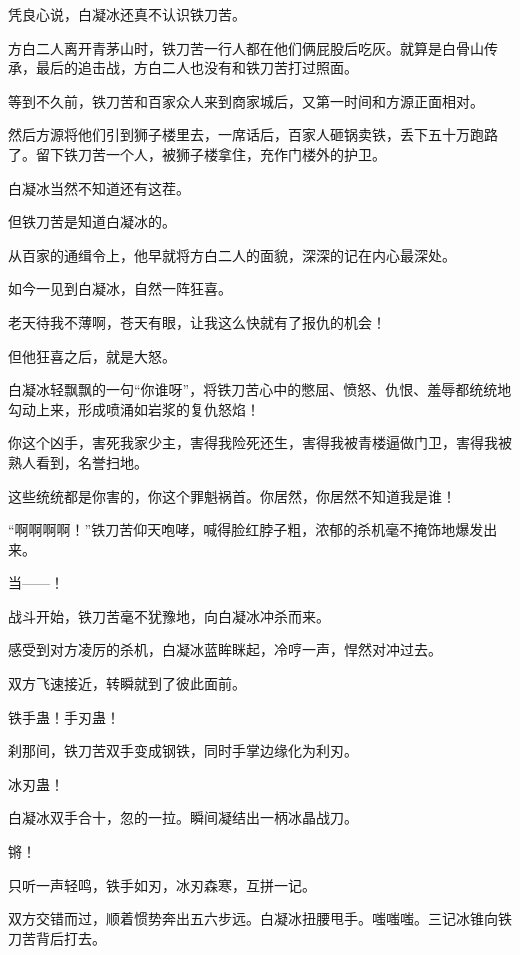 
\begin{this_body}



凭良心说，白凝冰还真不认识铁刀苦。

方白二人离开青茅山时，铁刀苦一行人都在他们俩屁股后吃灰。就算是白骨山传承，最后的追击战，方白二人也没有和铁刀苦打过照面。

等到不久前，铁刀苦和百家众人来到商家城后，又第一时间和方源正面相对。

然后方源将他们引到狮子楼里去，一席话后，百家人砸锅卖铁，丢下五十万跑路了。留下铁刀苦一个人，被狮子楼拿住，充作门楼外的护卫。

白凝冰当然不知道还有这茬。

但铁刀苦是知道白凝冰的。

从百家的通缉令上，他早就将方白二人的面貌，深深的记在内心最深处。

如今一见到白凝冰，自然一阵狂喜。

老天待我不薄啊，苍天有眼，让我这么快就有了报仇的机会！

但他狂喜之后，就是大怒。

白凝冰轻飘飘的一句“你谁呀”，将铁刀苦心中的憋屈、愤怒、仇恨、羞辱都统统地勾动上来，形成喷涌如岩浆的复仇怒焰！

你这个凶手，害死我家少主，害得我险死还生，害得我被青楼逼做门卫，害得我被熟人看到，名誉扫地。

这些统统都是你害的，你这个罪魁祸首。你居然，你居然不知道我是谁！

“啊啊啊啊！”铁刀苦仰天咆哮，喊得脸红脖子粗，浓郁的杀机毫不掩饰地爆发出来。

当——！

战斗开始，铁刀苦毫不犹豫地，向白凝冰冲杀而来。

感受到对方凌厉的杀机，白凝冰蓝眸眯起，冷哼一声，悍然对冲过去。

双方飞速接近，转瞬就到了彼此面前。

铁手蛊！手刃蛊！

刹那间，铁刀苦双手变成钢铁，同时手掌边缘化为利刃。

冰刃蛊！

白凝冰双手合十，忽的一拉。瞬间凝结出一柄冰晶战刀。

锵！

只听一声轻鸣，铁手如刃，冰刃森寒，互拼一记。

双方交错而过，顺着惯势奔出五六步远。白凝冰扭腰甩手。嗤嗤嗤。三记冰锥向铁刀苦背后打去。


\end{this_body}
